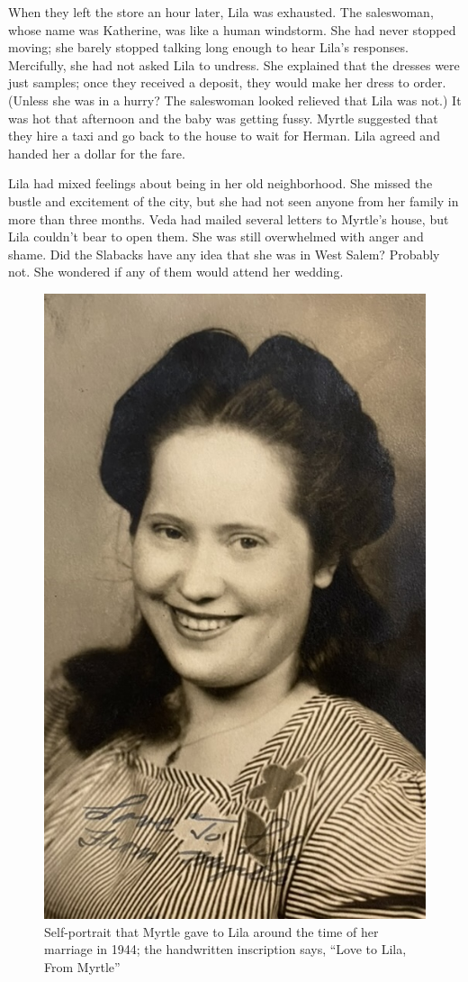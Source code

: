 \documentclass[
  letterpaper,
]{book}
\begin{document}
When they left the store an hour later, Lila was exhausted. The
saleswoman, whose name was Katherine, was like a human windstorm. She
had never stopped moving; she barely stopped talking long enough to hear
Lila's responses. Mercifully, she had not asked Lila to undress. She
explained that the dresses were just samples; once they received a
deposit, they would make her dress to order. (Unless she was in a hurry?
The saleswoman looked relieved that Lila was not.) It was hot that
afternoon and the baby was getting fussy. Myrtle suggested that they
hire a taxi and go back to the house to wait for Herman. Lila agreed and
handed her a dollar for the fare.

Lila had mixed feelings about being in her old neighborhood. She missed
the bustle and excitement of the city, but she had not seen anyone from
her family in more than three months. Veda had mailed several letters to
Myrtle's house, but Lila couldn't bear to open them. She was still
overwhelmed with anger and shame. Did the Slabacks have any idea that
she was in West Salem? Probably not. She wondered if any of them would
attend her wedding.

\begin{figure}[H]

{\centering \includegraphics[width=0.5\linewidth,height=\textheight,keepaspectratio]{images/Akou20.jpeg}

}

\caption[Self-portrait that Myrtle gave to Lila around the time of her
marriage in 1944]{Self-portrait that Myrtle gave to Lila around the time
of her marriage in 1944; the handwritten inscription says, ``Love to
Lila, From Myrtle''}

\end{figure}%
\end{document}
